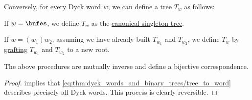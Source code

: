 \begin{corollary}
\begin{thmenum}
     Conversely, for every Dyck word \( w \), we can define a tree \( T_w \) as follows:
    \begin{thmenum}
       If \( w = \bnfes \), we define \( T_w \) as the \hyperref[def:canonical_singleton_tree]{canonical singleton tree}.

       If \( w = (w_1) w_2 \), assuming we have already built \( T_{w_1} \) and \( T_{w_2} \), we define \( T_w \) by \hyperref[def:ordered_tree_grafting_product]{grafting} \( T_{w_1} \) and \( T_{w_2} \) to a new root.
    \end{thmenum}

     The above procedures are mutually inverse and define a bijective correspondence.
  \end{thmenum}
\end{corollary}
\begin{proof}
   implies that \eqref{eq:thm:dyck_words_and_binary_trees/tree_to_word} describes precisely all Dyck words. This process is clearly reversible.
\end{proof}
